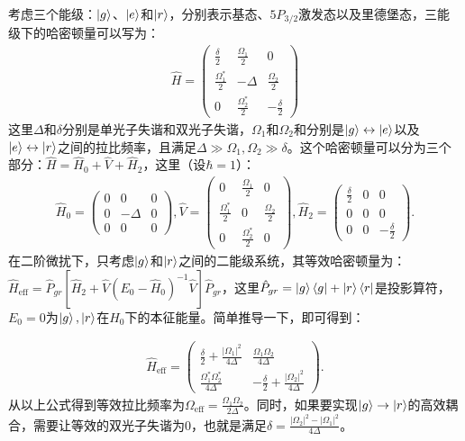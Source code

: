 \documentclass[../main.tex]{subfiles}
\begin{document}
考虑三个能级：$\ket{g}$、$\ket{e}$和$\ket{r}$，分别表示基态、$5P_{3/2}$激发态以及里德堡态，三能级下的哈密顿量可以写为：
\begin{align}
\hat{H}=
\begin{pmatrix} \frac{\delta}{2} & \frac{\Omega_1}{2} & 0 \\ 
\frac{\Omega_1^*}{2} & -\Delta &\frac{\Omega_2}{2}  \\
0 & \frac{\Omega_2^*}{2}  & -\frac{\delta}{2}
\end{pmatrix}
\label{ch4:fig:Hamiltonian}
\end{align}
这里$\Delta$和$\delta$分别是单光子失谐和双光子失谐，$\Omega_1$和$\Omega_2$和分别是$\ket{g}\leftrightarrow\ket{e}$以及$\ket{e}\leftrightarrow\ket{r}$之间的拉比频率，且满足$\Delta\gg\Omega_1,\Omega_2\gg\delta$。这个哈密顿量可以分为三个部分：$\hat{H}=\hat{H}_0+\hat{V}+\hat{H}_2$，这里（设$\hbar=1$）：
\begin{align}
\hat{H}_0=
\begin{pmatrix} 0 & 0 & 0 \\ 
0 & -\Delta & 0  \\
0 & 0  & 0
\end{pmatrix}, 
\hat{V}=
\begin{pmatrix} 0 & \frac{\Omega_1}{2} & 0 \\ 
\frac{\Omega_1^*}{2} & 0 &\frac{\Omega_2}{2}  \\
0 & \frac{\Omega_2^*}{2}  & 0
\end{pmatrix},
\hat{H}_2=
\begin{pmatrix} \frac{\delta}{2} & 0 & 0 \\ 
0 & 0 & 0  \\
0 & 0  & -\frac{\delta}{2}
\end{pmatrix}.
\end{align}
在二阶微扰下，只考虑$\ket{g}$和$\ket{r}$之间的二能级系统，其等效哈密顿量为：$\hat{H}_{\mathrm{eff}}=\hat{P}_{gr}[\hat{H}_2+\hat{V}(E_0-\hat{H}_0)^{-1}\hat{V}]\hat{P}_{gr}$，这里$\hat{P}_{gr}=\ket{g}\bra{g}+\ket{r}\bra{r}$是投影算符，$E_0=0$为$\ket{g},\ket{r}$在$\hat{H}_0$下的本征能量。简单推导一下，即可得到：

\begin{align}
\hat{H}_{\mathrm{eff}}=
\begin{pmatrix}
\frac{\delta}{2}+\frac{|\Omega_1|^2}{4\Delta} & \frac{\Omega_1\Omega_2}{4\Delta} \\
\frac{\Omega_1^*\Omega_2^*}{4\Delta}  & -\frac{\delta}{2}+\frac{|\Omega_2|^2}{4\Delta}
\end{pmatrix}.
\end{align}
从以上公式得到等效拉比频率为$\Omega_{\text{eff}}=\frac{\Omega_1\Omega_2}{2\Delta}$。同时，如果要实现$\ket{g}\to\ket{r}$的高效耦合，需要让等效的双光子失谐为0，也就是满足$\delta=\frac{|\Omega_2|^2-|\Omega_1|^2}{4\Delta}$。
\end{document}
